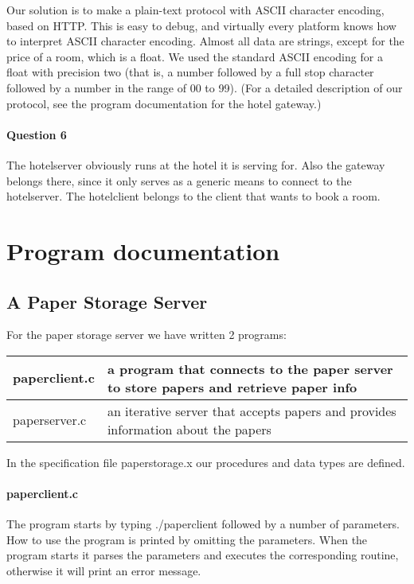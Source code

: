 \documentclass[a4paper,10pt]{article}
\begin{document}
Our solution is to make a plain-text protocol with ASCII character encoding, based on HTTP. This is easy to debug, and virtually every platform knows how to interpret ASCII character encoding. Almost all data are strings, except for the price of a room, which is a float. We used the standard ASCII encoding for a float with precision two (that is, a number followed by a full stop character followed by a number in the range of 00 to 99). (For a detailed description of our protocol, see the program documentation for the hotel gateway.)

\paragraph{Question 6}
The hotelserver obviously runs at the hotel it is serving for. Also the gateway belongs there, since it only serves as a generic means to connect to the hotelserver. The hotelclient belongs to the client that wants to book a room.

\section{Program documentation}
\subsection{A Paper Storage Server}

For the paper storage server we have written 2 programs:
\begin{center}
\begin{tabular}{ l | p{9cm} }
paperclient.c & a program that connects to the paper server to store papers and retrieve paper info\\ \hline
paperserver.c & an iterative server that accepts papers and provides information about the papers\\
\end{tabular}
\end{center}

In the specification file paperstorage.x our procedures and data types are defined.

\paragraph{paperclient.c}
The program starts by typing ./paperclient followed by a number of parameters. How to use the program is printed by omitting the parameters. When the program starts it parses the parameters and executes the corresponding routine, otherwise it will print an error message.
\end{document}
